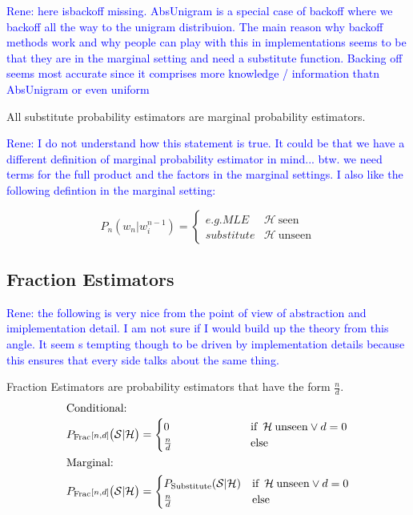 \documentclass[11pt,a4paper]{article}
\newcommand{\Seq}{\mathcal{S}}
\newcommand{\Hist}{\mathcal{H}}
\newcommand{\rp}[1]{\textcolor{blue}{Rene: #1}}
\begin{document}
  \rp{here isbackoff missing. AbsUnigram is a special case of backoff where we
  backoff all the way to the unigram distribuion. The main reason why backoff
  methods work and why people can play with this in implementations seems to be
  that they are in the marginal setting and need a substitute function. Backing
  off seems most accurate since it comprises more knowledge / information thatn
  AbsUnigram or even uniform}

  All substitute probability estimators are marginal probability estimators.

  \rp{I do not understand how this statement is true. It could be that we have a
  different definition of marginal probability estimator in mind... btw. we need
  terms for the full product and the factors in the marginal settings. I also
  like the following defintion in the marginal setting:}

  \begin{equation}
    P_n(w_n|w_i^{n-1})= \begin{cases}
      e.g. MLE & \Hist \: \mathrm{seen}  \\
      substitute & \Hist \: \mathrm{unseen}
    \end{cases}
  \end{equation}


  \subsection{Fraction Estimators}

  \rp{the following is very nice from the point of view of abstraction and
  imiplementation detail. I am not sure if I would build up the theory from this
  angle. It seem s tempting though to be driven by implementation details
  because this ensures that every side talks about the same thing.}

  Fraction Estimators are probability estimators that have the form $\frac{n}{d}$.
  \begin{alignat}{2}
    \intertext{Conditional:}
    P_\mathrm{Frac}{\scriptstyle[n , d]}\big(\Seq | \Hist\big) &= \begin{cases}
      0\hphantom{_\mathrm{Substitute}(\Seq | \Hist)} & \text{if} \enspace \Hist \: \mathrm{unseen} \lor d = 0 \\
      \frac{n}{d} & \text{else}
    \end{cases} \\
    \intertext{Marginal:}
    P_\mathrm{Frac}{\scriptstyle[n , d]}\big(\Seq | \Hist\big) &= \begin{cases}
      P_\mathrm{Substitute}(\Seq | \Hist) & \text{if} \enspace \Hist \: \mathrm{unseen} \lor d = 0 \\
      \frac{n}{d} & \text{else}
    \end{cases}
  \end{alignat}
\end{document}

